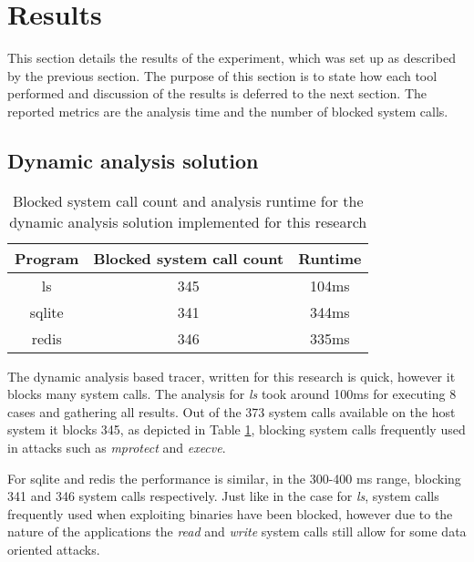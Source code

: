\section{Results}
\label{sec:results}
This section details the results of the experiment, which was set up as described by the previous section.
The purpose of this section is to state how each tool performed and discussion of the results is deferred to the next section.
The reported metrics are the analysis time and the number of blocked system calls.

\subsection {Dynamic analysis solution}
\begin{table}[!h]
\begin{center}
\caption{Blocked system call count and analysis runtime for the dynamic analysis solution implemented for this research}
\label{tbl:dyn_results}
\begin{tabular}{||c c c||} 
 \hline
 Program & Blocked system call count & Runtime \\
 \hline\hline
 ls & 345 & 104ms \\ 
 \hline
 sqlite & 341 & 344ms \\ 
 \hline
 redis & 346 & 335ms \\ 
 \hline
\end{tabular}
\end{center}
\end{table}

The dynamic analysis based tracer, written for this research is quick, however it blocks many system calls.
The analysis for \textit{ls} took around 100ms for executing 8 cases and gathering all results.
Out of the 373 system calls available on the host system it blocks 345, as depicted in Table \ref{tbl:dyn_results}, blocking system calls frequently used in attacks such as \textit{mprotect} and \textit{execve}.

For sqlite and redis the performance is similar, in the 300-400 ms range, blocking 341 and 346 system calls respectively. Just like in the case for \textit{ls}, system calls frequently used when exploiting binaries have been blocked, however due to the nature of the applications the \textit{read} and \textit{write} system calls still allow for some data oriented attacks.

